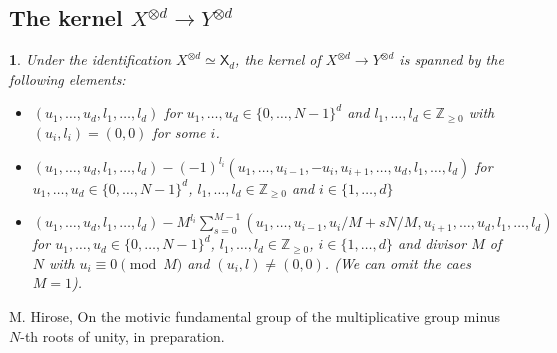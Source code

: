\documentclass[oneside,reqno]{amsart}
\numberwithin{equation}{section}
\numberwithin{figure}{section}
\theoremstyle{plain}
\theoremstyle{definition}
\theoremstyle{plain}
\newtheorem{prop}[thm]{\protect\propositionname}
\providecommand{\propositionname}{Proposition}
\begin{document}
\subsection{The kernel $X^{\otimes d}\to Y^{\otimes d}$}
\begin{prop}
Under the identification $X^{\otimes d}\simeq\mathsf{X}_{d}$, the
kernel of $X^{\otimes d}\to Y^{\otimes d}$ is spanned by the following
elements:
\begin{itemize}
\item $(u_{1},\dots,u_{d},l_{1},\dots,l_{d})$ for $u_{1},\dots,u_{d}\in\{0,\dots,N-1\}^{d}$
and $l_{1},\dots,l_{d}\in\mathbb{Z}_{\geq0}$ with $(u_{i},l_{i})=(0,0)$
for some $i$.
\item $(u_{1},\dots,u_{d},l_{1},\dots,l_{d})-(-1)^{l_{i}}(u_{1},\dots,u_{i-1},-u_{i},u_{i+1},\dots,u_{d},l_{1},\dots,l_{d})$
for $u_{1},\dots,u_{d}\in\{0,\dots,N-1\}^{d}$, $l_{1},\dots,l_{d}\in\mathbb{Z}_{\geq0}$
and $i\in\{1,\dots,d\}$
\item $(u_{1},\dots,u_{d},l_{1},\dots,l_{d})-M^{l_{i}}\sum_{s=0}^{M-1}(u_{1},\dots,u_{i-1},u_{i}/M+sN/M,u_{i+1},\dots,u_{d},l_{1},\dots,l_{d})$
for $u_{1},\dots,u_{d}\in\{0,\dots,N-1\}^{d}$, $l_{1},\dots,l_{d}\in\mathbb{Z}_{\geq0}$,
$i\in\{1,\dots,d\}$ and divisor $M$ of $N$ with $u_{i}\equiv0\pmod{M}$
and $(u_{i},l)\neq(0,0)$. (We can omit the caes $M=1$).
\end{itemize}
\end{prop}

\begin{thebibliography}{1}
M. Hirose, On the motivic fundamental group of the
multiplicative group minus $N$-th roots of unity, in preparation.

\end{thebibliography}
\end{document}
